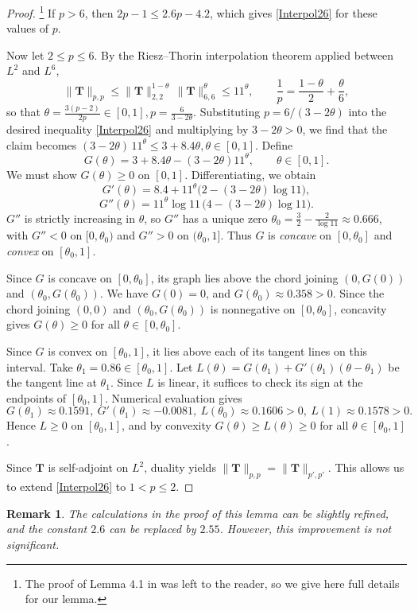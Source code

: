\documentclass[12pt,reqno]{amsart}
\newtheorem{remark}{Remark}
\newcommand{\T}{{\mathbf T}}
\begin{document}
\begin{proof}\footnote{The proof of Lemma 4.1 in \cite{IS2001} was left to the reader, so we give here full details for our lemma.}
If $p>6$, then $2p-1\le 2.6p-4.2$, which gives \eqref{Interpol26} for these values of $p$.
\par
Now let $2\le p\le 6$. By the Riesz--Thorin interpolation theorem applied between $L^2$ and $L^6$, $$\|\T\|_{p,p}\le \|\T\|_{2,2}^{1-\theta}\,\|\T\|_{6,6}^{\theta}\le 11^{\theta},
\qquad \frac1p=\frac{1-\theta}{2}+\frac{\theta}{6},$$
so that $\theta=\frac{3(p-2)}{2p}\in[0,1], p=\frac{6}{3-2\theta}.$
Substituting $p=6/(3-2\theta)$ into the desired inequality \eqref{Interpol26} and multiplying by $3-2\theta>0$, we find that the claim becomes $(3-2\theta)\,11^{\theta}\le 3+8.4\theta, \theta\in[0,1].$
Define
$$G(\theta)=3+8.4\theta-(3-2\theta)11^{\theta}, \qquad \theta\in[0,1].$$
We must show $G(\theta)\ge 0$ on $[0,1]$.
Differentiating, we obtain
$$G'(\theta)=8.4+11^{\theta}\bigl(2-(3-2\theta)\log 11\bigr),$$
$$G''(\theta)=11^{\theta}\log 11\,\bigl(4-(3-2\theta)\log 11\bigr).$$
$G''$ is strictly increasing in $\theta$, so $G''$ has a unique zero
$\theta_0=\frac{3}{2}-\frac{2}{\log 11}\approx 0.666$,
with $G''<0$ on $[0,\theta_0)$ and $G''>0$ on $(\theta_0,1]$. Thus
$G$ is \emph{concave} on $[0,\theta_0]$ and \emph{convex} on $[\theta_0,1]$.
\par
Since $G$ is concave on $[0,\theta_0]$, its graph lies above the chord joining
$(0,G(0))$ and $(\theta_0,G(\theta_0))$. We have $G(0)=0$, and $G(\theta_0)\approx 0.358> 0$.
Since the chord joining $(0,0)$ and $(\theta_0,G(\theta_0))$ is nonnegative on $[0,\theta_0]$, concavity gives $G(\theta)\ge 0$ for all $\theta\in[0,\theta_0]$.
\par
Since $G$ is convex on $[\theta_0,1]$, it lies above each of its tangent lines on this interval. Take $\theta_1=0.86\in [\theta_0,1]$. Let $L(\theta)=G(\theta_1)+G'(\theta_1)(\theta-\theta_1)$ be the tangent line at $\theta_1$.
Since $L$ is linear, it suffices to check its sign at the endpoints of $[\theta_0,1]$. Numerical evaluation gives
$$G(\theta_1)\approx 0.1591,\: G'(\theta_1)\approx -0.0081,\: L(\theta_0)\approx 0.1606>0, \: L(1)\approx 0.1578>0.$$
Hence $L\ge 0$ on $[\theta_0,1]$, and by convexity $G(\theta)\ge L(\theta)\ge 0$ for all $\theta\in[\theta_0,1]$.
\par
Since $\T$ is self-adjoint on $L^2$, duality yields $\|\T\|_{p,p}=\|\T\|_{p',p'}$. This allows us to extend \eqref{Interpol26} to $1<p\le2$.
\end{proof}
\begin{remark}
The calculations in the proof of this lemma can be slightly refined, and the constant $2.6$ can be replaced by $2.55$. However, this improvement is not significant.
\end{remark}
\end{document}
